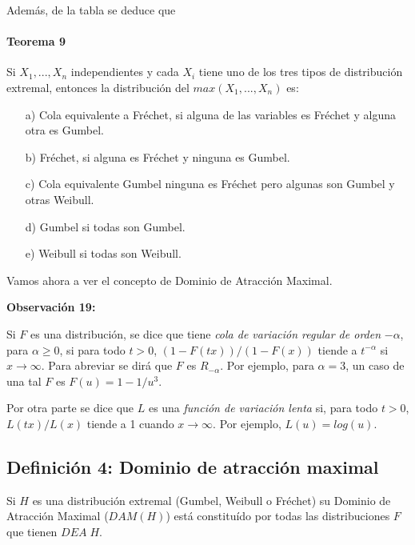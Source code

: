 \documentclass[
  oneside]{book}
\begin{document}
Además, de la tabla se deduce que

\hypertarget{teorema-9}{%
\paragraph{Teorema 9}\label{teorema-9}}

Si \(X_1,...,X_n\) independientes y cada \(X_i\) tiene uno de los tres
tipos de distribución extremal, entonces la distribución del
\(max(X_1,...,X_n)\) es:

\begin{itemize}
\item[a)] Cola equivalente a Fréchet, si alguna de las variables es Fréchet y alguna otra es Gumbel.
\item[b)]  Fréchet, si alguna es Fréchet y ninguna es Gumbel.
\item[c)]  Cola equivalente Gumbel ninguna es Fréchet pero algunas son Gumbel y otras Weibull.
\item[d)] Gumbel si todas son Gumbel.
\item[e)]  Weibull si todas son Weibull.
\end{itemize}

Vamos ahora a ver el concepto de Dominio de Atracción Maximal.

\textbf{Observación 19:}

Si \(F\) es una distribución, se dice que tiene
\textit{cola de variación regular de orden} \(-\alpha\), para
\(\alpha \geq 0\), si para todo \(t>0\), \((1-F(tx))/(1-F(x))\) tiende a
\(t^{-\alpha}\) si \(x \rightarrow \infty\). Para abreviar se dirá que
\(F\) es \(R_{-\alpha}\). Por ejemplo, para \(\alpha=3\), un caso de una
tal \(F\) es \(F(u)=1- 1/u^3\).

Por otra parte se dice que \(L\) es una
\textit{función de variación lenta} si, para todo \(t>0\),
\(L(tx)/L(x)\) tiende a 1 cuando \(x \rightarrow \infty\). Por ejemplo,
\(L(u)=log(u)\).

\newpage

\hypertarget{definiciuxf3n-4-dominio-de-atracciuxf3n-maximal}{%
\subsection{Definición 4: Dominio de atracción
maximal}\label{definiciuxf3n-4-dominio-de-atracciuxf3n-maximal}}

Si \(H\) es una distribución extremal (Gumbel, Weibull o Fréchet) su
Dominio de Atracción Maximal (\(DAM(H)\)) está constituído por todas las
distribuciones \(F\) que tienen \(DEA\;H\).
\end{document}
